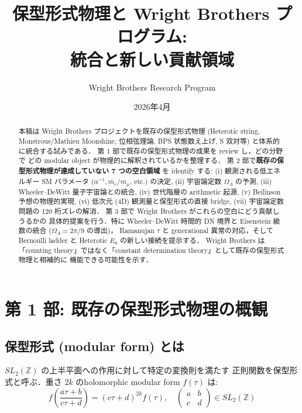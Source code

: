 \documentclass[11pt,a4paper]{article}
\title{保型形式物理と Wright Brothers プログラム:\\
統合と新しい貢献領域}
\author{Wright Brothers Research Program}
\date{2026年4月}
\begin{document}
\maketitle

\begin{abstract}
本稿は Wright Brothers プロジェクトを既存の保型形式物理
(Heterotic string, Monstrous/Mathieu Moonshine, 位相弦理論,
BPS 状態数え上げ, S 双対等) と体系的に統合する試みである．
第 1 部で既存の保型形式物理の成果を review し，どの分野で
どの modular object が物理的に解釈されているかを整理する．
第 2 部で\textbf{既存の保型形式物理が達成していない 7 つの空白領域}
を identify する: (i) 観測される低エネルギー SM パラメータ
($\alpha^{-1}, m_e/m_\mu$, etc.) の決定, (ii) 宇宙論定数
$\Omega_\Lambda$ の予測, (iii) Wheeler--DeWitt 量子宇宙論との統合,
(iv) 世代階層の arithmetic 起源, (v) Beilinson 予想の物理的実現,
(vi) 低次元 (4D) 観測量と保型形式の直接 bridge,
(vii) 宇宙論定数問題の 120 桁ズレの解消．
第 3 部で Wright Brothers がこれらの空白にどう貢献しうるかの
具体的提案を行う．特に Wheeler--DeWitt 時間的 DN 境界と
Eisenstein 級数の統合 ($\Omega_\Lambda = 2\pi/9$ の導出)，
Ramanujan $\tau$ と generational 異常の対応，そして
Bernoulli ladder と Heterotic $E_8$ の新しい接続を提示する．
Wright Brothers は「counting theory」ではなく「constant
determination theory」として既存の保型形式物理と相補的に
機能できる可能性を示す．
\end{abstract}

\tableofcontents

\newpage
\section{第 1 部: 既存の保型形式物理の概観}

\subsection{保型形式 (modular form) とは}

$SL_2(\mathbb{Z})$ の上半平面への作用に対して特定の変換則を満たす
正則関数を保型形式と呼ぶ．重さ $2k$ のholomorphic modular form
$f(\tau)$ は:
\begin{equation}
f\left(\frac{a\tau + b}{c\tau + d}\right) = (c\tau + d)^{2k} f(\tau),
\quad \begin{pmatrix} a & b \\ c & d\end{pmatrix} \in SL_2(\mathbb{Z})
\end{equation}
\end{document}
